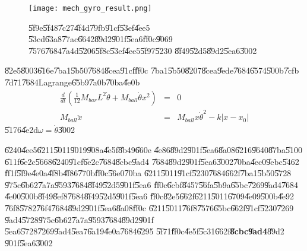 \begin{center}
\begin{figure}[th]
\caption{{}\U{5f9e}\U{5f48}\U{7c27}\U{4f4d}\U{79fb}\U{91cf}\U{53ef}\U{4ee5}%
\U{53cd}\U{63a8}\U{77ac}\U{6642}\U{89d2}\U{901f}\U{5ea6}\U{ff0c}\U{9069}%
\U{7576}\U{7684}\U{7a4d}\U{5206}\U{5f8c}\U{53ef}\U{4ee5}\U{5f97}\U{5230}%
\U{8f49}\U{52d5}\U{89d2}\U{5ea6}\U{3002}}
\begin{center}
\texttt{[image: mech\_gyro\_result.png]}
\end{center}
\end{figure}
\end{center}

\U{82e5}\U{8003}\U{616e}\U{7ba1}\U{5b50}\U{7684}\U{8cea}\U{91cf}\U{ff0c}%
\U{7ba1}\U{5b50}\U{8207}\U{8cea}\U{9ede}\U{7684}\U{6574}\U{500b}\U{7cfb}%
\U{7d71}\U{7684}Lagrange\U{65b9}\U{7a0b}\U{70ba}\U{4e0b}%
\begin{eqnarray*}
\frac{d}{dt}\left( \frac{1}{12}M_{bar}L^{2}\dot{\theta}+M_{ball}\dot{\theta}%
x^{2}\right) &=&0 \\
M_{ball}\ddot{x} &=&M_{ball}x\dot{\theta}^{2}-k\left\vert x-x_{0}\right\vert
\end{eqnarray*}%
\U{5176}\U{4e2d}$\omega =\dot{\theta}$\U{3002}

\bigskip

\U{6240}\U{4ee5}\U{6211}\U{5011}\U{9019}\U{908a}\U{4e5f}\U{8b49}\U{660e}%
\U{4e86}\U{89d2}\U{901f}\U{5ea6}\U{8a08}\U{6216}\U{9640}\U{87ba}\U{5100}%
\U{611f}\U{6e2c}\U{5668}\U{6240}\U{91cf}\U{6e2c}\U{7684}\U{8cbc}\U{9ad4}%
\U{7684}\U{89d2}\U{901f}\U{5ea6}\U{3002}\U{70ba}\U{4ec0}\U{9ebc}\U{5462}%
\U{ff1f}\U{5f9e}\U{4e0a}\U{4f8b}\U{4f86}\U{770b}\U{ff0c}\U{56e0}\U{70ba}%
\U{6211}\U{5011}\U{91cf}\U{5230}\U{7684}\U{662f}\U{7ba1}\U{5b50}\U{5728}%
\U{975c}\U{6b62}\U{7a7a}\U{9593}\U{7684}\U{8f49}\U{52d5}\U{901f}\U{5ea6}%
\U{ff0c}\U{6cbf}\U{8457}\U{56fa}\U{5b9a}\U{65bc}\U{7269}\U{9ad4}\U{7684}%
\U{4e00}\U{500b}\U{8f49}\U{8ef8}\U{7684}\U{8f49}\U{52d5}\U{901f}\U{5ea6}%
\U{ff0c}\U{82e5}\U{662f}\U{6211}\U{5011}\U{6709}\U{4e09}\U{500b}\U{4e92}%
\U{76f8}\U{5782}\U{76f4}\U{7684}\U{89d2}\U{901f}\U{5ea6}\U{8a08}\U{ff0c}%
\U{6211}\U{5011}\U{76f8}\U{7576}\U{65bc}\U{662f}\U{91cf}\U{5230}\U{7269}%
\U{9ad4}\U{5728}\U{975c}\U{6b62}\U{7a7a}\U{9593}\U{7684}\U{89d2}\U{901f}%
\U{5ea6}\U{5728}\U{7269}\U{9ad4}\U{5ea7}\U{6a19}\U{4e0a}\U{7684}\U{6295}%
\U{5f71}\U{ff0c}\U{4e5f}\U{5c31}\U{662f}\textbf{\U{8cbc}\U{9ad4}}\U{89d2}%
\U{901f}\U{5ea6}\U{3002}\bigskip

